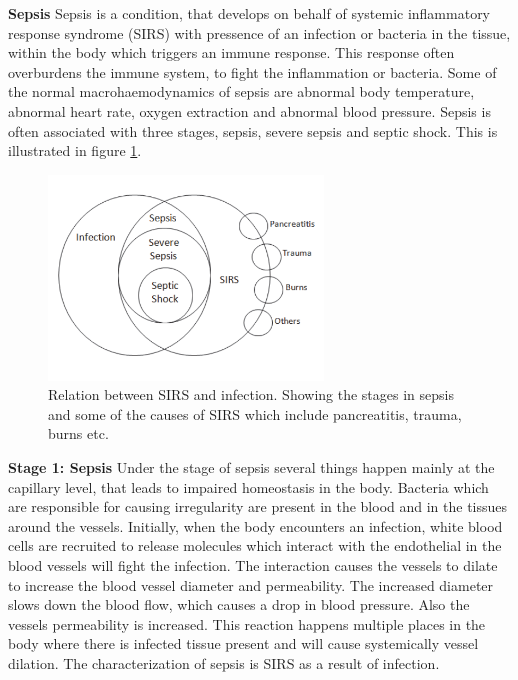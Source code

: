 
\label{chap:sepsis}
\textbf{Sepsis}
Sepsis is a condition, that develops on behalf of systemic inflammatory response syndrome (SIRS) with pressence of an infection or bacteria in the tissue, within the body which triggers an immune response. This response often overburdens the immune system, to fight the inflammation or bacteria. Some of the normal macrohaemodynamics of sepsis are abnormal body temperature, abnormal heart rate, oxygen extraction and abnormal blood pressure.\cite{pluta2010,kanta2014}
Sepsis is often associated with three stages, sepsis, severe sepsis and septic shock. This is illustrated in figure \ref{fig:Sepsis_stages}.

\begin{figure}[H]
	\centering	\includegraphics[width=0.65\textwidth]{figures/Sepsis_stages}
	\caption{Relation between SIRS and infection. Showing the stages in sepsis and some of the causes of SIRS which include pancreatitis, trauma, burns etc.\cite{kanta2014}}
	\label{fig:Sepsis_stages}
\end{figure} \vspace{-.3cm}


\textbf{Stage 1: Sepsis}
Under the stage of sepsis several things happen mainly at the capillary level, that leads to impaired homeostasis in the body. Bacteria which are responsible for causing irregularity are present in the blood and in the tissues around the vessels. Initially, when the body encounters an infection, white blood cells are recruited to release molecules which interact with the endothelial in the blood vessels will fight the infection. The interaction causes the vessels to dilate to increase the blood vessel diameter and permeability. The increased diameter slows down the blood flow, which causes a drop in blood pressure. Also the vessels permeability is increased. This reaction happens multiple places in the body where there is infected tissue present and will cause systemically vessel dilation. The characterization of sepsis is SIRS as a result of infection.\cite{baudouin2008,kanta2014}


